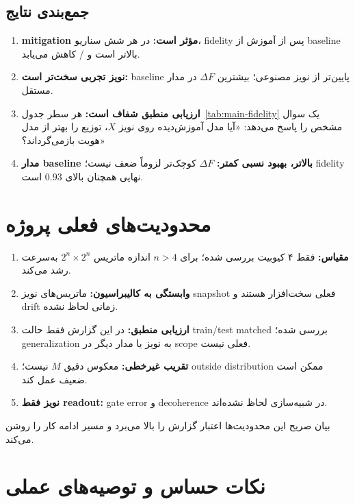 \subsection{جمع‌بندی نتایج}

\begin{enumerate}
	\item \textbf{mitigation مؤثر است:} در هر شش سناریو، fidelity پس از آموزش از baseline بالاتر است و / کاهش می‌یابد.
	\item \textbf{نویز تجربی سخت‌تر است:} baseline پایین‌تر از نویز مصنوعی؛ بیشترین $\Delta F$ در مدار مستقل.
	\item \textbf{ارزیابی منطبق شفاف است:} هر سطر جدول~\ref{tab:main-fidelity} یک سوال مشخص را پاسخ می‌دهد: «آیا مدل آموزش‌دیده روی نویز $X$، توزیع را بهتر از مدل هویت بازمی‌گرداند؟»
	\item \textbf{مدار  baseline بالاتر، بهبود نسبی کمتر:} $\Delta F$ کوچک‌تر لزوماً ضعف نیست؛ fidelity نهایی همچنان بالای $0.93$ است.
\end{enumerate}

\section{محدودیت‌های فعلی پروژه}

\begin{enumerate}
	\item \textbf{مقیاس:} فقط ۴ کیوبیت بررسی شده؛ برای $n>4$ اندازه ماتریس $2^n\times2^n$ به‌سرعت رشد می‌کند.
	\item \textbf{وابستگی به کالیبراسیون:} ماتریس‌های نویز snapshot فعلی سخت‌افزار هستند و drift زمانی لحاظ نشده.
	\item \textbf{ارزیابی منطبق:} در این گزارش فقط حالت train/test matched بررسی شده؛ generalization به نویز یا مدار دیگر در scope فعلی نیست.
	\item \textbf{تقریب غیرخطی:}  معکوس دقیق $M$ نیست؛ outside distribution ممکن است ضعیف عمل کند.
	\item \textbf{نویز فقط readout:} gate error و decoherence در شبیه‌سازی لحاظ نشده‌اند.
\end{enumerate}
بیان صریح این محدودیت‌ها اعتبار گزارش را بالا می‌برد و مسیر ادامه کار را روشن می‌کند.

\section{نکات حساس و توصیه‌های عملی}

